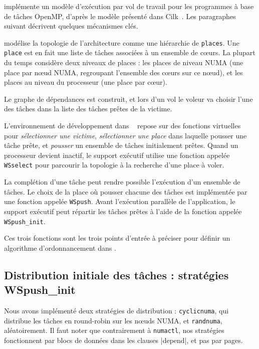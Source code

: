 \documentclass[parallelisme]{compas2016}
\begin{document}
\kaapi implémente un modèle d'exécution par vol de travail pour les programmes
à base de tâches OpenMP, d'après le modèle présenté dans Cilk~\cite{cilk5}.
Les paragraphes suivant décrivent quelques mécanismes clés.


\kaapi modélise la topologie de l'architecture comme une hiérarchie de \verb/places/.
Une \verb/place/ est en fait une liste de tâches associées à un ensemble de cœurs.
La plupart du temps \kaapi considère deux niveaux de places : les places de niveau
NUMA (une place par nœud NUMA, regroupant l'ensemble des cœurs sur ce nœud),
et les places au niveau du processeur (une place par cœur).


Le graphe de dépendances est construit, et lors d'un vol le voleur va choisir
l'une des tâches dans la liste des tâches prêtes de la victime.

L'environnement de développement dans \kaapi~\cite{DBLP:journals/corr/BleuseGLMT14} repose sur des fonctions
virtuelles pour \textit{sélectionner une victime}, \textit{sélectionner une place} dans
laquelle pousser une tâche prête, et \textit{pousser} un ensemble de tâches initialement
prêtes.
Quand un processeur devient inactif, le support exécutif utilise une fonction appelée
\verb/WSselect/ pour parcourir la topologie à la recherche d'une place à voler.

La complétion d'une tâche peut rendre possible l'exécution d'un ensemble de tâches.
Le choix de la place où pousser chacune des tâches est implémentée par une fonction
appelée \verb/WSpush/.
Avant l'exécution parallèle de l'application, le support exécutif peut répartir
les tâches prêtes à l'aide de la fonction appelée \verb/WSpush_init/.

Ces trois fonctions sont les trois points d'entrée à préciser pour définir
un algorithme d'ordonnancement dans \kaapi.



\vspace*{-1ex}
\subsection{Distribution initiale des tâches : stratégies WSpush\_init}

Nous avons implémenté deux stratégies de distribution : \verb/cyclicnuma/, qui
distribue les tâches en round-robin sur les nœuds NUMA, et \verb/randnuma/, aléatoirement.
Il faut noter que contrairement à \verb/numactl/, nos stratégies fonctionnent
par blocs de données dans les clauses |depend|, et pas par pages.
\end{document}

